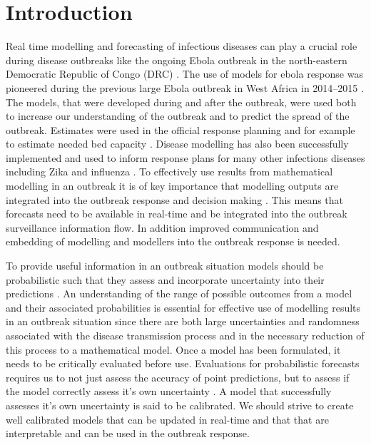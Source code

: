 \documentclass[12pt]{article}
\begin{document}
\newpage

\tableofcontents

\newpage

\section{Introduction}


Real time modelling and forecasting of infectious diseases can play a crucial role during disease outbreaks like the ongoing Ebola outbreak in the north-eastern Democratic Republic of Congo (DRC) \cite{heesterbeekModelingInfectiousDisease2015,riversUsingOutbreakScience2019a}. The use of models for ebola response was pioneered during the previous large Ebola outbreak in West Africa in 2014--2015 \cite{chretienMathematicalModelingWest}. The models, that were developed during and after the outbreak, were used both to increase our understanding of the outbreak and to predict the spread of the outbreak. Estimates were used in the official response planning \cite{whoebolaresponseteamEbolaVirusDisease2014} and for example to estimate needed bed capacity \cite{camachoTemporalChangesEbola2015}. Disease modelling has also been successfully implemented and used to inform response plans for many other infections diseases including Zika \cite{kobresSystematicReviewEvaluation2019} and influenza \cite{chretienInfluenzaForecastingHuman2014}. To effectively use results from mathematical modelling in an outbreak it is of key importance that modelling outputs are integrated into the outbreak response and decision making \cite{riversUsingOutbreakScience2019a}. This means that forecasts need to be available in real-time and be integrated into the outbreak surveillance information flow. In addition improved communication and embedding of modelling and modellers into the outbreak response is needed. 

To provide useful information in an outbreak situation models should be probabilistic such that they assess and incorporate uncertainty into their predictions \cite{funkAssessingPerformanceRealtime2019, weiCalibrationTestsCount2014,gneitingEditorialProbabilisticForecasting2008}. An understanding of the range of possible outcomes from a model and their associated probabilities is essential for effective use of modelling results in an outbreak situation since there are both large uncertainties and randomness associated with the disease transmission process and in the necessary reduction of this process to a mathematical model. Once a model has been formulated, it needs to be critically evaluated before use. Evaluations for probabilistic forecasts requires us to not just assess the accuracy of point predictions, but to assess if the model correctly assess it's own uncertainty \cite{gneitingProbabilisticForecastsCalibration2007, czadoPredictiveModelAssessment2009}. A model that successfully assesses it's own uncertainty is said to be calibrated. We should strive to create well calibrated models that can be updated in real-time and that that are interpretable and can be used in the outbreak response. 
\end{document}

